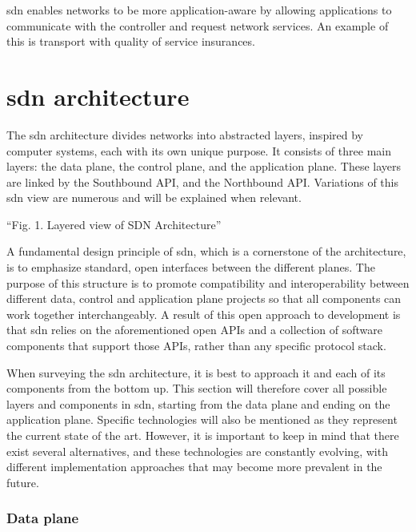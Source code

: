 \gls{sdn} enables networks to be more application-aware by allowing applications to communicate with the controller and request network services. An example of this is transport with quality of service insurances. \cite{thyagaturu_software_2016}


\section[SDN architecture]{\gls{sdn} architecture} %

The \gls{sdn} architecture divides networks into abstracted layers, inspired by computer systems, each with its own unique purpose\cite{kreutz_software-defined_2015}. It consists of three main layers: the data plane, the control plane, and the application plane. These layers are linked by the Southbound API, and the Northbound API. Variations of this \gls{sdn} view are numerous and will be explained when relevant.

“Fig. 1. Layered view of SDN Architecture” \cite{latif_comprehensive_2020}

A fundamental design principle of \gls{sdn}, which is a cornerstone of the architecture, is to emphasize standard, open interfaces between the different planes. The purpose of this structure is to promote compatibility and interoperability between different data, control and application plane projects so that all components can work together interchangeably\cite{kreutz_software-defined_2015}. A result of this open approach to development is that \gls{sdn} relies on the aforementioned open APIs and a collection of software components that support those APIs, rather than any specific protocol stack\cite{peterson_software-defined_2021}. 

When surveying the \gls{sdn} architecture, it is best to approach it and each of its components from the bottom up. This section will therefore cover all possible layers and components in \gls{sdn}, starting from the data plane and ending on the application plane. Specific technologies will also be mentioned as they represent the current state of the art. However, it is important to keep in mind that there exist several alternatives, and these technologies are constantly evolving, with different implementation approaches that may become more prevalent in the future. \cite{peterson_software-defined_2021}



\subsubsection{Data plane} %


